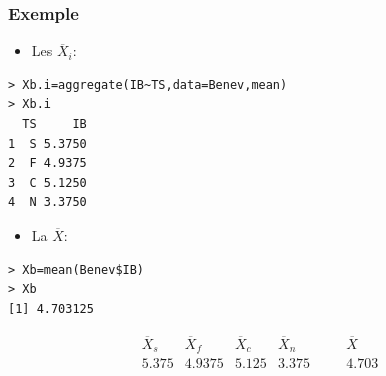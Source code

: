 \documentclass[12pt,t]{beamer}
\theoremstyle{plain}
\theoremstyle{definition}
\begin{document}
\begin{frame}[fragile]
\frametitle{Exemple}\vspace*{-1ex}

\begin{itemize}
\item Les $\overline{X}_{i}$:
\end{itemize}
\begin{lstlisting}
> Xb.i=aggregate(IB~TS,data=Benev,mean)
> Xb.i
  TS     IB
1  S 5.3750
2  F 4.9375
3  C 5.1250
4  N 3.3750
\end{lstlisting}

\begin{itemize}
\item La $\overline{X}$:
\end{itemize}
\begin{lstlisting}
> Xb=mean(Benev$IB)
> Xb
[1] 4.703125
\end{lstlisting}


$$
\begin{array}{cccccc}
\overline{X}_s & \overline{X}_f & \overline{X}_c & \overline{X}_n & \quad & \overline{X}\\\hline
5.375 & 4.9375 &  5.125 & 3.375 & & 4.703
\end{array}
$$
\end{frame}
\end{document}
